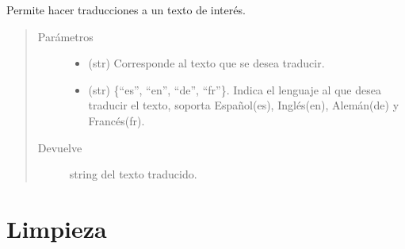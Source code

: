 \documentclass[letterpaper,10pt,openany,spanish]{sphinxmanual}
\begin{document}

\begin{fulllineitems}
\label{\detokenize{funciones/lenguajes:lenguajes.traducir_texto}}
Permite hacer traducciones a un texto de interés.
\begin{quote}\begin{description}
\item[{Parámetros}] \leavevmode\begin{itemize}
\item {} 
 \textendash{} (str) Corresponde al texto que se desea traducir.

\item {} 
 \textendash{} (str) \{“es”, “en”, “de”, “fr”\}. 
Indica el lenguaje al que desea traducir el texto, soporta 
Español(es), Inglés(en), Alemán(de) y Francés(fr).

\end{itemize}

\item[{Devuelve}] \leavevmode
string del texto traducido.

\end{description}\end{quote}

\end{fulllineitems}



\chapter{Limpieza}
\label{\detokenize{funciones/limpieza:module-limpieza}}\label{\detokenize{funciones/limpieza:limpieza}}\label{\detokenize{funciones/limpieza::doc}}
\end{document}
